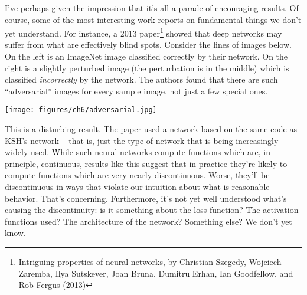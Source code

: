 \documentclass[a4paper,twoside,10pt]{book}
\begin{document}
I've perhaps given the impression that it's all a parade of encouraging results. Of course, some of the most interesting work reports on fundamental things we don't yet understand. For instance, a 2013 paper\footnote{\href{http://arxiv.org/abs/1312.6199}{Intriguing properties of neural networks}, by Christian Szegedy, Wojciech Zaremba, Ilya Sutskever, Joan Bruna, Dumitru Erhan, Ian Goodfellow, and Rob Fergus (2013)} showed that deep networks may suffer from what are effectively blind spots. Consider the lines of images below. On the left is an ImageNet image classified correctly by their network. On the right is a slightly perturbed image (the perturbation is in the middle) which is classified \textit{incorrectly} by the network. The authors found that there are such ``adversarial'' images for every sample image, not just a few special ones.
\begin{center}
	\texttt{[image: figures/ch6/adversarial.jpg]}
\end{center}
This is a disturbing result. The paper used a network based on the same code as KSH's network -- that is, just the type of network that is being increasingly widely used. While such neural networks compute functions which are, in principle, continuous, results like this suggest that in practice they're likely to compute functions which are very nearly discontinuous. Worse, they'll be discontinuous in ways that violate our intuition about what is reasonable behavior. That's concerning. Furthermore, it's not yet well understood what's causing the discontinuity: is it something about the loss function? The activation functions used? The architecture of the network? Something else? We don't yet know.
\end{document}
